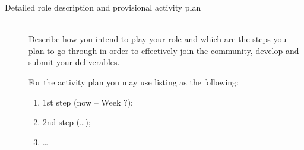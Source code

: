 \documentclass[runningheads]{llncs}
\begin{document}
\begin{description}
  \item[Detailed role description and provisional activity plan]\mbox{}\\
     Describe how you intend to play your role and which are the steps you plan to go through in order to effectively
     join the community, develop and submit your deliverables.
     
     For the activity plan you may use listing as the following:
     \begin{enumerate}
       \item 1st step (now -- Week ?);
       \item 2nd step (\dots);
       \item \dots
     \end{enumerate}     
\end{description}
\end{document}
